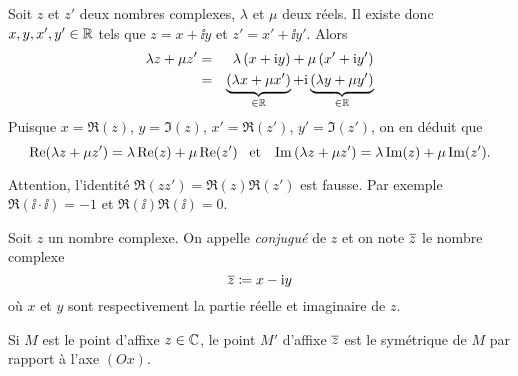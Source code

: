 \documentclass{magnoliaold}
\begin{document}
\begin{preuve}
Soit $z$ et $z'$ deux nombres complexes, $\lambda$ et $\mu$ deux réels.
Il existe donc $x,y,x',y'\in\mathbb{R}$ tels que $z=x+\ii y$ et $z'=x'+\ii y'$. Alors
\begin{eqnarray*}
\lambda z+\mu z'
&=& \lambda\left(x+{\rm i} y\right)+\mu\left(x'+{\rm i} y'\right)\\
&=& \underbrace{\left(\lambda x+\mu x'\right)}_{\in\mathbb{R}}+{\rm i}
    \underbrace{\left(\lambda y+\mu y'\right)}_{\in\mathbb{R}}
\end{eqnarray*}
Puisque $x=\Re(z)$, $y=\Im(z)$, $x'=\Re(z')$, $y'=\Im(z')$, on en déduit que
\[\mathop{\rm Re}(\lambda z+\mu z')=\lambda\mathop{\rm Re}(z)+\mu\mathop{\rm Re}(z') \quad\!\text{et}\quad\!
  \mathop{\rm Im}\left(\lambda z+\mu z'\right)=\lambda\mathop{\rm Im}(z)+\mu\mathop{\rm Im}(z').\]
\end{preuve}

\begin{remarqueUnique}
\remarque Attention, l'identité $\Re(z z')=\Re(z)\Re(z')$ est fausse.
  Par exemple $\Re(\ii\cdot \ii)=-1$ et $\Re(\ii)\Re(\ii)=0$.
\end{remarqueUnique}

\begin{definition}[utile=-3]
  Soit $z$ un nombre complexe. On appelle \emph{conjugué} de $z$ et on note
  $\overline{z}$ le nombre complexe
  $$\overline{z}\coloneqq x-{\rm i} y$$
  où $x$ et $y$ sont respectivement la partie réelle et imaginaire de $z$.
\end{definition}

\begin{remarqueUnique}
\remarque Si $M$ est le point d'affixe $z\in\mathbb{C}$, le point $M'$ d'affixe $\overline{z}$ est le symétrique de $M$ par rapport à l'axe $(Ox).$
\end{remarqueUnique}
\end{document}
